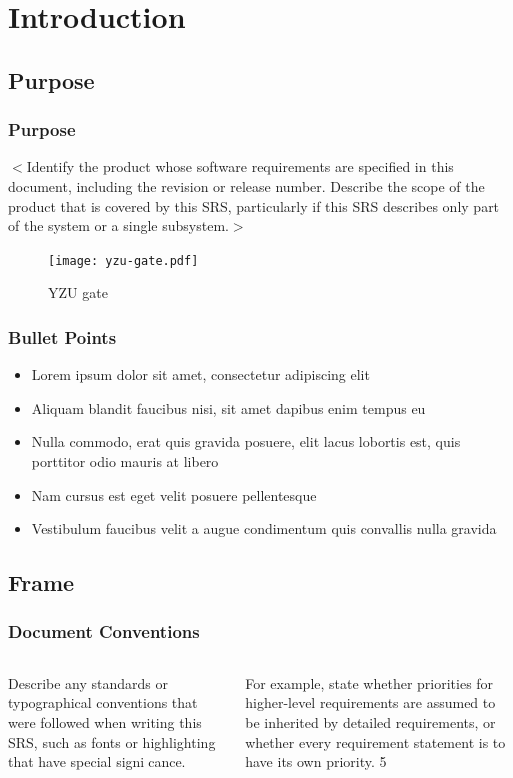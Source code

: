 \documentclass{beamer}
\begin{document}
\section{Introduction}

\begin{frame}
\subsection{Purpose}
\frametitle{Purpose}
$<$Identify the product whose software requirements are specified in this 
document, including the revision or release number. Describe the scope of the 
product that is covered by this SRS, particularly if this SRS describes only 
part of the system or a single subsystem.$>$



\begin{figure}
\texttt{[image: yzu-gate.pdf]}
\caption{YZU gate}
\label{fig:1}
\end{figure}

\end{frame}


\begin{frame}
\frametitle{Bullet Points}
\begin{itemize}
\item Lorem ipsum dolor sit amet, consectetur adipiscing elit
\item Aliquam blandit faucibus nisi, sit amet dapibus enim tempus eu
\item Nulla commodo, erat quis gravida posuere, elit lacus lobortis est, quis porttitor odio mauris at libero
\item Nam cursus est eget velit posuere pellentesque
\item Vestibulum faucibus velit a augue condimentum quis convallis nulla gravida
\end{itemize}
\end{frame}
\begin{frame}
\subsection{Frame}
\frametitle{Document Conventions}
\begin{columns}[c]
Describe any standards or
typographical conventions that
were followed when writing this
SRS, such as fonts or highlighting
that have special signicance.

For example, state whether priorities
for higher-level requirements are
assumed to be inherited by detailed
requirements, or whether every
requirement statement is to have its
own priority.
5
\end{columns}
\end{frame}
\end{document}
